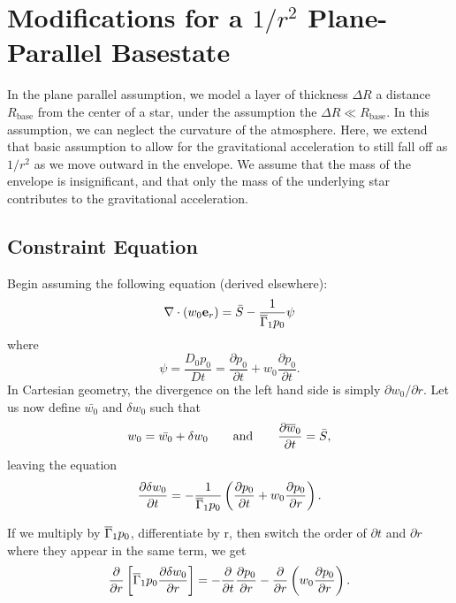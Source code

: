 
\section{\label{app:gravity} Modifications for a $1/r^2$ Plane-Parallel Basestate}

In the plane parallel assumption, we model a layer of thickness
$\Delta R$ a distance $R_\mathrm{base}$ from the center of a star,
under the assumption the $\Delta R \ll R_\mathrm{base}$.  In this
assumption, we can neglect the curvature of the atmosphere.  Here, we 
extend that basic assumption to allow for the gravitational acceleration
to still fall off as $1/r^2$ as we move outward in the envelope.  We assume
that the mass of the envelope is insignificant, and that only the mass of 
the underlying star contributes to the gravitational acceleration.

\subsection{Constraint Equation}

Begin assuming the following equation (derived elsewhere):
\begin{equation}
\nabla \cdot  ({w_0 \mathbf{e}_r}) = \bar{S} - \frac{1}{\overline{\Gamma}_1 p_0} \psi
\end{equation}
where
\[ \psi = \frac{D_0 p_0}{D t} = \frac{\partial p_0}{\partial t} + w_0 \frac{\partial p_0}{\partial t}. \]
In Cartesian geometry, the divergence on the left hand side is simply $\partial
w_0 / \partial r$.
Let us now define $\bar{w_0}$ and $\delta w_0$ such that
\[ w_0 = \bar{w_0} + \delta w_0 \quad\quad \mbox{and} \quad\quad
\frac{\partial \overline{w}_0}{\partial t} = \bar{S}, \]
leaving the equation
\begin{equation}
\frac{\partial \delta w_0}{\partial t} = - \frac{1}{\overline{\Gamma}_1 p_0} \left ({ \frac{\partial p_0}{\partial t} + w_0 \frac{\partial p_0}{\partial r}} \right ).
\end{equation}

If we multiply by $\overline{\Gamma}_1 p_0$, differentiate by r, then switch the order of $\partial
t$ and $\partial r$ where they appear in the same term, we get
\begin{equation}
\frac{\partial}{\partial r} \left[ \overline{\Gamma}_1 p_0 \frac{\partial \delta w_0}{\partial r} \right] =
   - \frac{\partial}{\partial t} \frac{\partial p_0}{\partial r} -  \frac{\partial}{\partial r} \left (w_0 \frac{\partial p_0}{\partial r} \right) .
\end{equation}

